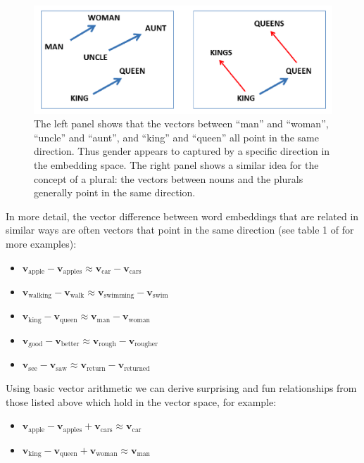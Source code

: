 \begin{figure}[h]
\centering
\includegraphics[scale=0.4]{./images/kingQueen.png}
\caption[From \cite{mikolov2013linguistic}.]{The left panel shows that the vectors between ``man'' and ``woman'', ``uncle'' and ``aunt'', and ``king'' and ``queen'' all point in the same direction. Thus gender appears to captured by a specific direction in the embedding space. The right panel shows a similar idea for the concept of a plural: the vectors between nouns and the plurals generally point in the same direction.}
\label{geometryWordEmbedding}
\end{figure}

In more detail, the vector difference between word embeddings that are related in similar ways are often vectors that point in the same direction (see table 1 of \cite{mikolov2013linguistic} for more examples):

\begin{itemize}
  \item $\textbf{v}_\text{apple} - \textbf{v}_\text{apples} \approx \textbf{v}_\text{car} - \textbf{v}_\text{cars}$
  \item $\textbf{v}_\text{walking} - \textbf{v}_\text{walk} \approx \textbf{v}_\text{swimming} - \textbf{v}_\text{swim}$
  \item $\textbf{v}_\text{king} - \textbf{v}_\text{queen} \approx \textbf{v}_\text{man} - \textbf{v}_\text{woman}$
  \item $\textbf{v}_\text{good} - \textbf{v}_\text{better} \approx \textbf{v}_\text{rough} - \textbf{v}_\text{rougher}$
  \item $\textbf{v}_\text{see} - \textbf{v}_\text{saw} \approx \textbf{v}_\text{return} - \textbf{v}_\text{returned}$
\end{itemize}

Using basic vector arithmetic we can derive surprising and fun relationships from those listed above which hold in the vector space, for example:

\begin{itemize}
  \item $\textbf{v}_\text{apple} - \textbf{v}_\text{apples} + \textbf{v}_\text{cars} \approx \textbf{v}_\text{car} $
  \item $\textbf{v}_\text{king} - \textbf{v}_\text{queen} + \textbf{v}_\text{woman} \approx  \textbf{v}_\text{man}$
\end{itemize}

